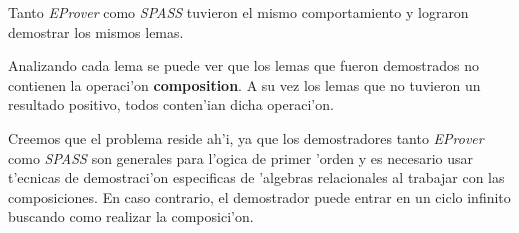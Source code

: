 \vspace{1em}

Tanto \textit{EProver} como \textit{SPASS} tuvieron el mismo comportamiento y lograron demostrar los mismos lemas.

Analizando cada lema se puede ver que los lemas que fueron demostrados no contienen la operaci'on \textbf{composition}. A su vez los lemas que no tuvieron un resultado positivo, todos conten'ian dicha operaci'on. 

Creemos que el problema reside ah'i, ya que los demostradores tanto \textit{EProver} como  \textit{SPASS} son generales para l'ogica de primer 'orden y es necesario usar t'ecnicas de demostraci'on especificas de 'algebras relacionales al trabajar con las composiciones. En caso contrario, el demostrador puede entrar en un ciclo infinito buscando como realizar la composici'on.


